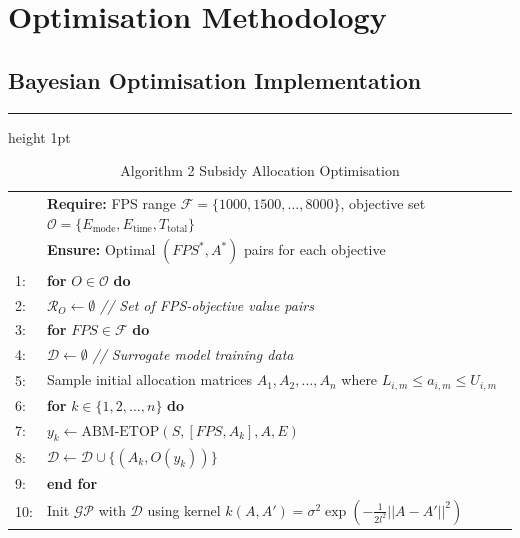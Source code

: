 \documentclass[a4paper,fleqn]{cas-sc}
\begin{document}
\section{Optimisation Methodology}\label{sec:optimisation}

\subsection{Bayesian Optimisation Implementation}

\begin{table}[width=\textwidth]
\caption{Algorithm 2 Subsidy Allocation Optimisation}
\label{alg:subsidy-opt}
\hrule height 1pt
\vspace{0.5em}
\begin{tabular}{p{}p{}}
& \textbf{Require:} FPS range $\mathcal{F} = \{1000, 1500, \ldots, 8000\}$, objective set $\mathcal{O} = \{E_{\text{mode}}, E_{\text{time}}, T_{\text{total}}\}$ \\
& \textbf{Ensure:} Optimal $(FPS^*, A^*)$ pairs for each objective \\
1: & \textbf{for} $O \in \mathcal{O}$ \textbf{do} \\
2: & \hspace{1em} $\mathcal{R}_O \gets \emptyset$ \textit{// Set of FPS-objective value pairs} \\
3: & \hspace{1em} \textbf{for} $FPS \in \mathcal{F}$ \textbf{do} \\
4: & \hspace{2em} $\mathcal{D} \gets \emptyset$ \textit{// Surrogate model training data} \\
5: & \hspace{2em} Sample initial allocation matrices $A_1, A_2, \ldots, A_n$ where $L_{i,m} \leq a_{i,m} \leq U_{i,m}$ \\
6: & \hspace{2em} \textbf{for} $k \in \{1, 2, \ldots, n\}$ \textbf{do} \\
7: & \hspace{3em} $y_k \gets \text{ABM-ETOP}(S, [FPS, A_k], A, E)$ \\
8: & \hspace{3em} $\mathcal{D} \gets \mathcal{D} \cup \{(A_k, O(y_k))\}$ \\
9: & \hspace{2em} \textbf{end for} \\
10: & \hspace{2em} Init $\mathcal{GP}$ with $\mathcal{D}$ using kernel $k(A, A') = \sigma^2 \exp(-\frac{1}{2l^2}||A-A'||^2)$ \\

\end{tabular}
\end{table}
\end{document}
